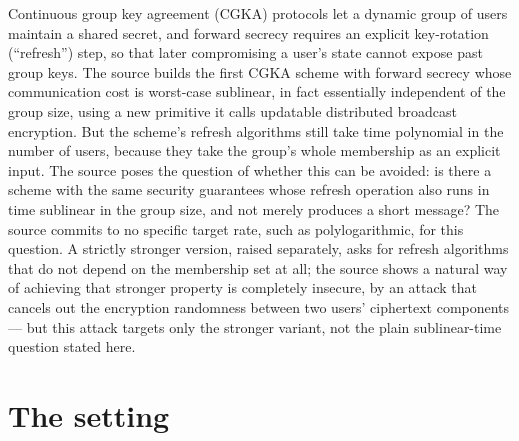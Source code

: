 \documentclass{aicr-conjecture}
\begin{document}

\vspace{0.4em}

\begin{informalconjecture}
Continuous group key agreement (CGKA) protocols let a dynamic group of
users maintain a shared secret, and forward secrecy requires an
explicit key-rotation (``refresh'') step, so that later compromising a
user's state cannot expose past group keys. The source builds the
first CGKA scheme with forward secrecy whose communication cost is
worst-case sublinear, in fact essentially independent of the group
size, using a new primitive it calls updatable distributed broadcast
encryption. But the scheme's refresh algorithms still take time
polynomial in the number of users, because they take the group's whole
membership as an explicit input. The source poses the question of
whether this can be avoided: is there a scheme with the same security
guarantees whose refresh operation also runs in time sublinear in the
group size, and not merely produces a short message? The source
commits to no specific target rate, such as polylogarithmic, for this
question. A strictly stronger version, raised separately, asks for
refresh algorithms that do not depend on the membership set at all; the
source shows a natural way of achieving that stronger property is
completely insecure, by an attack that cancels out the encryption
randomness between two users' ciphertext components --- but this
attack targets only the stronger variant, not the plain sublinear-time
question stated here.
\end{informalconjecture}

\section{The setting}\label{sec:setting}
\end{document}
